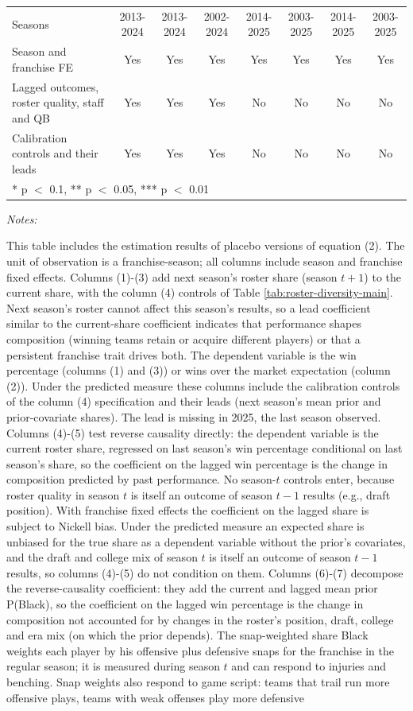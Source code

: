 \begin{table}[!h]
{\begin{threeparttable}
\begin{tabular}[t]{lccccccc}
Seasons & 2013-2024 & 2013-2024 & 2002-2024 & 2014-2025 & 2003-2025 & 2014-2025 & 2003-2025\\
Season and franchise FE & Yes & Yes & Yes & Yes & Yes & Yes & Yes\\
Lagged outcomes, roster quality, staff and QB & Yes & Yes & Yes & No & No & No & No\\
Calibration controls and their leads & Yes & Yes & Yes & No & No & No & No\\
\bottomrule
\multicolumn{8}{l}{\rule{0pt}{1em}* p $<$ 0.1, ** p $<$ 0.05, *** p $<$ 0.01}\\
\end{tabular}
\begin{tablenotes}[para]
\item \textit{Notes:} 
\item This table includes the estimation results of placebo versions of equation (2). The unit of observation is a franchise-season; all columns include season and franchise fixed effects. Columns (1)-(3) add next season's roster share (season $t+1$) to the current share, with the column (4) controls of Table \ref{tab:roster-diversity-main}. Next season's roster cannot affect this season's results, so a lead coefficient similar to the current-share coefficient indicates that performance shapes composition (winning teams retain or acquire different players) or that a persistent franchise trait drives both. The dependent variable is the win percentage (columns (1) and (3)) or wins over the market expectation (column (2)). Under the predicted measure these columns include the calibration controls of the column (4) specification and their leads (next season's mean prior and prior-covariate shares).  The lead is missing in 2025, the last season observed. Columns (4)-(5) test reverse causality directly: the dependent variable is the current roster share, regressed on last season's win percentage conditional on last season's share, so the coefficient on the lagged win percentage is the change in composition predicted by past performance. No season-$t$ controls enter, because roster quality in season $t$ is itself an outcome of season $t-1$ results (e.g., draft position). With franchise fixed effects the coefficient on the lagged share is subject to Nickell bias. Under the predicted measure an expected share is unbiased for the true share as a dependent variable without the prior's covariates, and the draft and college mix of season $t$ is itself an outcome of season $t-1$ results, so columns (4)-(5) do not condition on them. Columns (6)-(7) decompose the reverse-causality coefficient: they add the current and lagged mean prior P(Black), so the coefficient on the lagged win percentage is the change in composition not accounted for by changes in the roster's position, draft, college and era mix (on which the prior depends). The snap-weighted share Black weights each player by his offensive plus defensive snaps for the franchise in the regular season; it is measured during season $t$ and can respond to injuries and benching. Snap weights also respond to game script: teams that trail run more offensive plays, teams with weak offenses play more defensive 
\end{tablenotes}
\end{threeparttable}}
\end{table}
